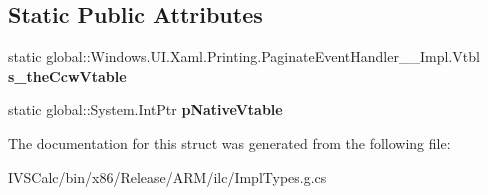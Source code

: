 \subsection*{Static Public Attributes}
\begin{DoxyCompactItemize}
\item 
\mbox{\label{struct_windows_1_1_u_i_1_1_xaml_1_1_printing_1_1_paginate_event_handler_____impl_1_1_vtbl_ab612f8988ad692479317bc9dea922a42}} 
static global\+::\+Windows.\+U\+I.\+Xaml.\+Printing.\+Paginate\+Event\+Handler\+\_\+\+\_\+\+Impl.\+Vtbl {\bfseries s\+\_\+the\+Ccw\+Vtable}
\item 
\mbox{\label{struct_windows_1_1_u_i_1_1_xaml_1_1_printing_1_1_paginate_event_handler_____impl_1_1_vtbl_a5d54579ed734a8b5c0de489924e12030}} 
static global\+::\+System.\+Int\+Ptr {\bfseries p\+Native\+Vtable}
\end{DoxyCompactItemize}


The documentation for this struct was generated from the following file\+:\begin{DoxyCompactItemize}
\item 
I\+V\+S\+Calc/bin/x86/\+Release/\+A\+R\+M/ilc/Impl\+Types.\+g.\+cs\end{DoxyCompactItemize}
